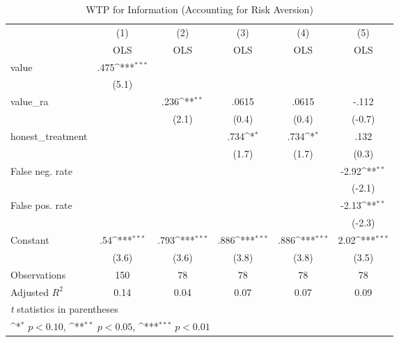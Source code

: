 \begin{table}[htbp]\centering
\def\sym#1{\ifmmode^{#1}\else\(^{#1}\)\fi}
\caption{WTP for Information (Accounting for Risk Aversion)}
\begin{tabular}{l*{5}{c}}
\hline\hline
                &\multicolumn{1}{c}{(1)}&\multicolumn{1}{c}{(2)}&\multicolumn{1}{c}{(3)}&\multicolumn{1}{c}{(4)}&\multicolumn{1}{c}{(5)}\\
                &\multicolumn{1}{c}{OLS}&\multicolumn{1}{c}{OLS}&\multicolumn{1}{c}{OLS}&\multicolumn{1}{c}{OLS}&\multicolumn{1}{c}{OLS}\\
\hline
value           &     .475\sym{***}&                  &                  &                  &                  \\
                &    (5.1)         &                  &                  &                  &                  \\
value\_ra        &                  &     .236\sym{**} &    .0615         &    .0615         &    -.112         \\
                &                  &    (2.1)         &    (0.4)         &    (0.4)         &   (-0.7)         \\
honest\_treatment&                  &                  &     .734\sym{*}  &     .734\sym{*}  &     .132         \\
                &                  &                  &    (1.7)         &    (1.7)         &    (0.3)         \\
False neg. rate &                  &                  &                  &                  &    -2.92\sym{**} \\
                &                  &                  &                  &                  &   (-2.1)         \\
False pos. rate &                  &                  &                  &                  &    -2.13\sym{**} \\
                &                  &                  &                  &                  &   (-2.3)         \\
Constant        &      .54\sym{***}&     .793\sym{***}&     .886\sym{***}&     .886\sym{***}&     2.02\sym{***}\\
                &    (3.6)         &    (3.6)         &    (3.8)         &    (3.8)         &    (3.5)         \\
\hline
Observations    &      150         &       78         &       78         &       78         &       78         \\
Adjusted \(R^{2}\)&     0.14         &     0.04         &     0.07         &     0.07         &     0.09         \\
\hline\hline
\multicolumn{6}{l}{\footnotesize \textit{t} statistics in parentheses}\\
\multicolumn{6}{l}{\footnotesize \sym{*} \(p<0.10\), \sym{**} \(p<0.05\), \sym{***} \(p<0.01\)}\\
\end{tabular}
\end{table}
